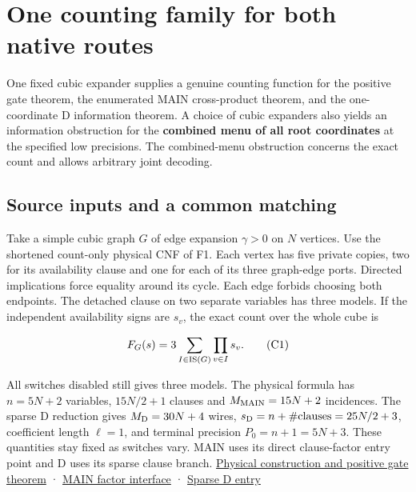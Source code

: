 \documentclass[
  11pt,
]{article}
\begin{document}
\section{One counting family for both native
routes}\label{v8-section-common-native-family}

One fixed cubic expander supplies a genuine counting function for the
positive gate theorem, the enumerated MAIN cross-product theorem, and
the one-coordinate D information theorem. A choice of cubic expanders
also yields an information obstruction for the \textbf{combined menu of
all root coordinates} at the specified low precisions. The combined-menu
obstruction concerns the exact count and allows arbitrary joint
decoding.

\subsection{Source inputs and a common
matching}\label{v8-source-inputs-and-a-common-matching}

Take a simple cubic graph \(G\) of edge expansion \(\gamma>0\) on \(N\)
vertices. Use the shortened count-only physical CNF of F1. Each vertex
has five private copies, two for its availability clause and one for
each of its three graph-edge ports. Directed implications force equality
around its cycle. Each edge forbids choosing both endpoints. The
detached clause on two separate variables has three models. If the
independent availability signs are \(s_v\), the exact count over the
whole cube is

\[
 F_G(s)=3\sum_{I\in{\rm IS}(G)}\prod_{v\in I}s_v.                 \tag{C1}
\]

All switches disabled still gives three models. The physical formula has
\(n=5N+2\) variables, \(15N/2+1\) clauses and \(M_{\rm MAIN}=15N+2\)
incidences. The sparse D reduction gives \(M_{\rm D}=30N+4\) wires,
\(s_{\rm D}=n+\#\mathrm{clauses}=25N/2+3\), coefficient length
\(\ell=1\), and terminal precision \(P_0=n+1=5N+3\). These quantities
stay fixed as switches vary. MAIN uses its direct clause-factor entry
point and D uses its sparse clause branch.
\hyperref[v8-section-stronger-family]{Physical construction and positive
gate theorem} ·
\href{https://github.com/openai/math/blob/main/preprints/The-Exponential-Time-Hypothesis-is-False-October-25-2026/build/main_full_version.tex\#L1675}{MAIN
factor interface} ·
\href{https://github.com/openai/math/blob/main/preprints/The-Exponential-Time-Hypothesis-is-False-October-25-2026/build/quantitative-reduction.tex\#L65}{Sparse
D entry}
\end{document}

